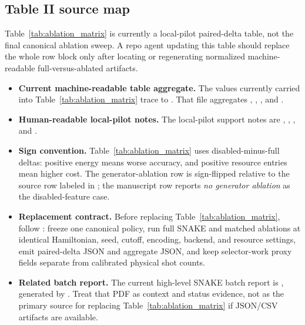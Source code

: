 \documentclass[
  reprint,
  amsmath,
  amssymb,
  aps,
  pra,
  nofootinbib,
  superscriptaddress,
  floatfix
]{revtex4-2}
\begin{document}
\subsection{Table II source map}
\label{app:table_ii_source_map}

Table~\ref{tab:ablation_matrix} is currently a local-pilot paired-delta table, not the final canonical ablation sweep. A repo agent updating this table should replace the whole row block only after locating or regenerating normalized machine-readable full-versus-ablated artifacts.

\begin{itemize}
\item \textbf{Current machine-readable table aggregate.} The values currently carried into Table~\ref{tab:ablation_matrix} trace to . That file aggregates , , , and .
\item \textbf{Human-readable local-pilot notes.} The local-pilot support notes are , , , and .
\item \textbf{Sign convention.} Table~\ref{tab:ablation_matrix} uses disabled-minus-full deltas: positive energy means worse accuracy, and positive resource entries mean higher cost. The generator-ablation row is sign-flipped relative to the source row labeled  in ; the manuscript row reports \emph{no generator ablation} as the disabled-feature case.
\item \textbf{Replacement contract.} Before replacing Table~\ref{tab:ablation_matrix}, follow : freeze one canonical policy, run full SNAKE and matched ablations at identical Hamiltonian, seed, cutoff, encoding, backend, and resource settings, emit paired-delta JSON and aggregate JSON, and keep selector-work proxy fields separate from calibrated physical shot counts.
\item \textbf{Related batch report.} The current high-level SNAKE batch report is , generated by . Treat that PDF as context and status evidence, not as the primary source for replacing Table~\ref{tab:ablation_matrix} if JSON/CSV artifacts are available.
\end{itemize}
\end{document}
